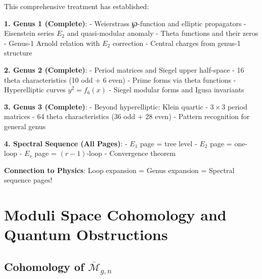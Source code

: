 \begin{remark}
\label{rem:higher-genus-summary-complete}
This comprehensive treatment has established:

\textbf{1. Genus 1 (Complete)}:
- Weierstrass ℘-function and elliptic propagators
- Eisenstein series $E_2$ and quasi-modular anomaly  
- Theta functions and their zeros
- Genus-1 Arnold relation with $E_2$ correction
- Central charges from genus-1 structure

\textbf{2. Genus 2 (Complete)}:
- Period matrices and Siegel upper half-space
- 16 theta characteristics (10 odd + 6 even)
- Prime forms via theta functions
- Hyperelliptic curves $y^2 = f_6(x)$
- Siegel modular forms and Igusa invariants

\textbf{3. Genus 3 (Complete)}:
- Beyond hyperelliptic: Klein quartic
- $3 \times 3$ period matrices
- 64 theta characteristics (36 odd + 28 even)
- Pattern recognition for general genus

\textbf{4. Spectral Sequence (All Pages)}:
- $E_1$ page = tree level
- $E_2$ page = one-loop
- $E_r$ page = $(r-1)$-loop
- Convergence theorem

\textbf{Connection to Physics}: Loop expansion = Genus expansion = Spectral sequence pages!
\end{remark}


\section{Moduli Space Cohomology and Quantum Obstructions}
\label{sec:moduli-cohomology-quantum}

\subsection{Cohomology of $\overline{\mathcal{M}}_{g,n}$}


